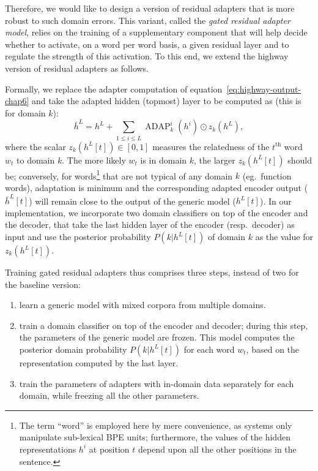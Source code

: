 Therefore, we would like to design a version of residual adapters that is more robust to such domain errors. This variant, called the \emph{gated residual adapter model}, relies on the training of a supplementary component that will help decide whether to activate, on a word per word basis, a given residual layer and to regulate the strength of this activation. To this end, we extend the highway version of residual adapters as follows.

Formally, we replace the adapter computation of equation~\eqref{eq:highway-output-chap6} and take the adapted hidden (topmost) layer to be computed as (this is for domain $k$):
\begin{equation}
  \bar{h}^L = h^L + \displaystyle{\mathop{\sum}_{1 \leq i \leq L} \operatorname{ADAP}_k^i(h^i) \odot{} z_k(h^L)}, \label{eq:gated-output-chap6}
\end{equation}
where the scalar $z_k(h^L[t]) \in [0,1]$ measures the relatedness of the $t^{\text{th}}$ word $w_t$ to domain $k$. The more likely $w_t$ is in domain $k$, the larger $z_k(h^L[t])$ should be; conversely, for words\footnote{The term ``word'' is employed here by mere convenience, as systems only manipulate sub-lexical BPE units; furthermore, the values of the hidden representations $h^{i}$ at position $t$ depend upon all the other positions in the sentence.} that are not typical of any domain $k$ (eg.\ function words),  adaptation is minimum and the corresponding adapted encoder output ($\bar{h}^L[t]$) will remain close to the output of the generic model ($h^L[t]$). In our implementation, we incorporate two domain classifiers on top of the encoder and the decoder, that take the last hidden layer of the encoder (resp.\ decoder) as input and use the posterior probability $P(k|h^L[t])$ of domain $k$ as the value for $z_k(h^L[t])$.

Training gated residual adapters thus comprises three steps, instead of two for the baseline version:
\begin{enumerate}
\item learn a generic model with mixed corpora from multiple domains.
\item train a domain classifier on top of the encoder and decoder; during this step, the parameters of the generic model are frozen. This model computes the posterior domain probability $P(k|h^L[t])$ for each word $w_t$, based on the representation computed by the last layer.
\item train the parameters of adapters with in-domain data separately for each domain, while freezing all the other parameters.
\end{enumerate}

